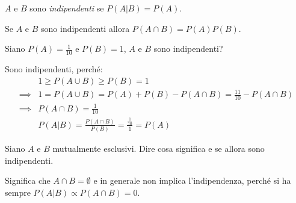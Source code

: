 \begin{definition}[Indipendenza]
	$A$ e $B$ sono \emph{indipendenti} se $P(A|B) = P(A)$.
\end{definition}

\begin{exercise}
	Se $A$ e $B$ sono indipendenti allora $P(A\cap B) = P(A)P(B)$.
\end{exercise}

\begin{exercise}
	Siano $P(A)=\frac1{10}$ e $P(B)=1$, $A$ e $B$ sono indipendenti?
\end{exercise}

\begin{solution}
	Sono indipendenti, perché:
	\begin{align*}
		&1 \ge P(A\cup B) \ge P(B) = 1 \\
		\implies &1 = P(A\cup B) = P(A) + P(B) - P(A\cap B) = \frac{11}{10} - P(A\cap B) \\
		\implies &P(A\cap B) = \frac{1}{10} \\
		&P(A|B) = \frac{P(A\cap B)}{P(B)} = \frac{\frac{1}{10}}{1} = P(A)
	\end{align*}
\end{solution}

\begin{exercise}
	Siano $A$ e $B$ mutualmente esclusivi. Dire cosa significa e se allora sono indipendenti.
\end{exercise}

\begin{solution}
	Significa che $A\cap B=\emptyset$ e in generale non implica l'indipendenza, perché si ha sempre $P(A|B)\propto P(A\cap B)=0$.
\end{solution}
